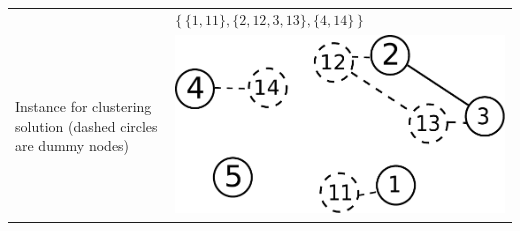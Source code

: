 \documentclass[10pt,journal,compsoc]{IEEEtran}
\makeatletter
\theoremstyle{mytheoremstyle}
\theoremstyle{mytheoremstyle}
\theoremstyle{mytheoremstyle}
\renewenvironment{proof}[1][\proofname]{%
      \par\pushQED{\qed}\fontfamily{ptm}\selectfont%
      \topsep6\p@\@plus6\p@\relax
      \trivlist\item[\hskip\labelsep\bfseries#1\@addpunct{.}]%
      \ignorespaces
    }{%
      \popQED\endtrivlist\@endpefalse
    }
\makeatother
\begin{document}
\begin{proof}
\begin{itemize}
\begin{table}[h!]
\begin{center}
\begin{tabular}{ p{3cm}  p{4.5cm} }
      & 
		$\{ \, \{1,11\},\{2,12, 3, 13\}, \{ 4,14\} \, \}$
      \\    \cmidrule(r){1-1}\cmidrule(lr){2-2}
	Instance for clustering solution (dashed circles are dummy nodes)
	  &
	  \begin{minipage}{.3\textwidth}
      \includegraphics[width=0.6\linewidth]{np_hard_proof_dummy.pdf}
    \end{minipage}
	  \\       \bottomrule
      \end{tabular}
      \caption{}
      \label{no_hard_proof_instance}
      \end{center}
      \end{table}






\end{itemize}
\end{proof}
\end{document}
